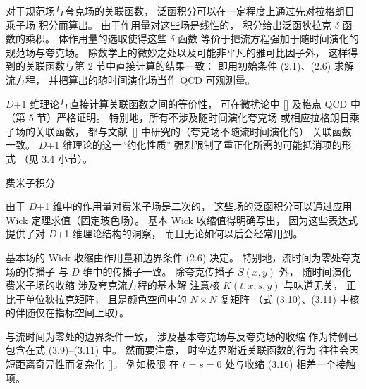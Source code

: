 对于规范场与夸克场的关联函数，
泛函积分可以在一定程度上通过先对拉格朗日乘子场
积分而算出。
由于作用量对这些场是线性的，
积分给出泛函狄拉克 $\delta$ 函数的乘积。
体作用量的选取使得这些 $\delta$ 函数
等价于把流方程强加于随时间演化的规范场与夸克场。
除数学上的微妙之处以及可能非平凡的雅可比因子外，
这样得到的关联函数与第 2 节中直接计算的结果一致：
即用初始条件 (2.1)、(2.6) 求解流方程，
并把算出的随时间演化场当作 QCD 可观测量。

$D$+1 维理论与直接计算关联函数之间的等价性，
可在微扰论中 [\cite{RenFlow}]
及格点 QCD 中（第 5 节）严格证明。
特别地，所有不涉及随时间演化夸克场
或相应拉格朗日乘子场的关联函数，
都与文献~[\cite{RenFlow}] 中研究的（夸克场不随流时间演化的）
关联函数一致。
$D$+1 维理论的这一``约化性质''
强烈限制了重正化所需的可能抵消项的形式
（见 3.4 小节）。


 费米子积分

由于 $D$+1 维中的作用量对费米子场是二次的，
这些场的泛函积分可以通过应用 Wick 定理求值（固定玻色场）。
基本 Wick 收缩值得明确写出，
因为这些表达式提供了对 $D$+1 维理论结构的洞察，
而且无论如何以后会经常用到。

基本场的 Wick 收缩由作用量和边界条件 (2.6) 决定。
特别地，流时间为零处夸克场的传播子
与 $D$ 维中的传播子一致。
除夸克传播子 $S(x,y)$ 外，
随时间演化费米子场的收缩
涉及夸克流方程的基本解
注意核 $K(t,x;s,y)$ 与味道无关，
正比于单位狄拉克矩阵，
且是颜色空间中的 $N\times N$ 复矩阵
（式 (3.10)、(3.11) 中核的伴随仅在指标空间上取）。

与流时间为零处的边界条件一致，
涉及基本夸克场与反夸克场的收缩
作为特例已包含在式 (3.9)--(3.11) 中。
然而要注意，
时空边界附近关联函数的行为
往往会因短距离奇异性而复杂化
[\cite{Symanzik}]。
例如极限
在 $t=s=0$ 处与收缩 (3.16) 相差一个接触项。


